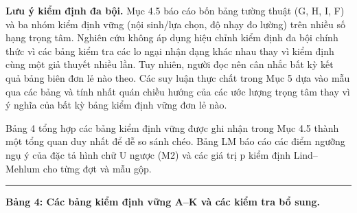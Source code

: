 \documentclass[12pt,a4paper]{article}
\begin{document}
\textbf{Lưu ý kiểm định đa bội.} Mục 4.5 báo cáo bốn bảng tường thuật
(G, H, I, F) và ba nhóm kiểm định vững (nội sinh/lựa chọn, độ nhạy đo
lường) trên nhiều số hạng trọng tâm. Nghiên cứu không áp dụng hiệu chỉnh
kiểm định đa bội chính thức vì các bảng kiểm tra các lo ngại nhận dạng
khác nhau thay vì kiểm định cùng một giả thuyết nhiều lần. Tuy nhiên,
người đọc nên cân nhắc bất kỳ kết quả bảng biên đơn lẻ nào theo. Các suy
luận thực chất trong Mục 5 dựa vào mẫu qua các bảng và tính nhất quán
chiều hướng của các ước lượng trọng tâm thay vì ý nghĩa của bất kỳ bảng
kiểm định vững đơn lẻ nào.

Bảng 4 tổng hợp các bảng kiểm định vững được ghi nhận trong Mục 4.5
thành một tổng quan duy nhất để dễ so sánh chéo. Bảng LM báo cáo các
điểm ngưỡng ngụ ý của đặc tả hình chữ U ngược (M2) và các giá trị p kiểm
định Lind--Mehlum cho từng đợt và mẫu gộp.

\begin{center}\rule{0.5\linewidth}{0.5pt}\end{center}

\textbf{Bảng 4: Các bảng kiểm định vững A--K và các kiểm tra bổ sung.}
\end{document}
